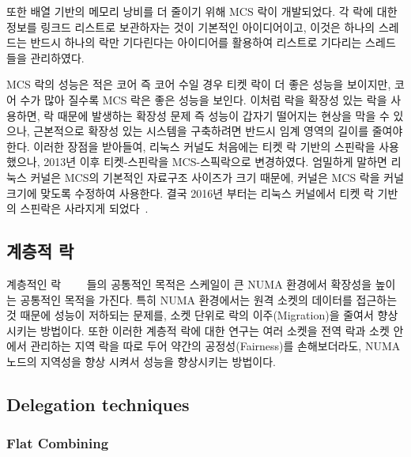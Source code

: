 또한 배열 기반의 메모리 낭비를 더 줄이기 위해 MCS 락이 개발되었다. 
각 락에 대한 정보를 링크드 리스트로 보관하자는 것이 기본적인 아이디어이고, 
이것은 하나의 스레드는 반드시 하나의 락만 기다린다는 아이디어를 활용하여 리스트로 기다리는 
스레드들을 관리하였다. 
 
MCS 락의 성능은 적은 코어 즉 코어 수일 경우 티켓 락이 더 좋은 성능을 보이지만, 
코어 수가 많아 질수록 MCS 락은 좋은 성능을 보인다. 
이처럼 락을 확장성 있는 락을 사용하면, 락 때문에 발생하는 확장성 문제 즉 성능이 갑자기 떨어지는 현상을 
막을 수 있으나, 근본적으로 확장성 있는 시스템을 구축하려면 반드시 임계 영역의 길이를 줄여야한다.
이러한 장점을 받아들여, 리눅스 커널도 처음에는 티켓 락 기반의 스핀락을 사용했으나, 
2013년 이후 티켓-스핀락을 MCS-스픽락으로 변경하였다. 
엄밀하게 말하면 리눅스 커널은 MCS의 기본적인 자료구조 사이즈가 크기 때문에, 커널은 MCS 락을 커널 크기에 
맞도록 수정하여 사용한다. 
결국 2016년 부터는  리눅스 커널에서 티켓 락 기반의 스핀락은 사라지게 되었다~\cite{ticket}.
 
\subsection{계층적 락}

계층적인 락~\cite{Radovic2003HBL}~\cite{Chabbi2016CLL}~\cite{Luchangco2006HCQ}
~\cite{Chabbi2015HPL}들의 공통적인 목적은 스케일이 큰 NUMA 환경에서 확장성을 높이는 공통적인 목적을 가진다.  
특히 NUMA 환경에서는 원격 소켓의 데이터를 접근하는 것 때문에 성능이 저하되는 문제를,
소켓 단위로 락의 이주(Migration)을 줄여서 향상시키는 방법이다.
또한 이러한 계층적 락에 대한 연구는 여러 소켓을 전역 락과 소켓 안에서 관리하는
지역 락을 따로 두어 약간의 공정성(Fairness)를 손해보더라도, 
NUMA 노드의 지역성을 향상 시켜서 성능을 향상시키는 방법이다.

\subsection{Delegation techniques}

\subsubsection{Flat Combining}

